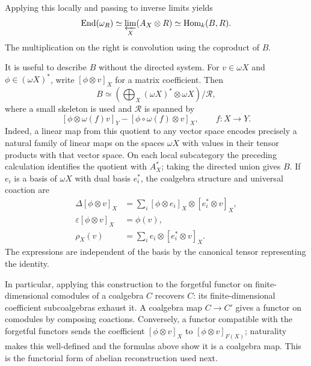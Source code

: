 Applying this locally and passing to inverse limits yields
\[
 \operatorname{End}(\omega_R)
 \simeq\varprojlim_X(A_X\otimes R)
 \simeq\operatorname{Hom}_k(B,R).
\]
The multiplication on the right is convolution using the coproduct of $B$.

It is useful to describe $B$ without the directed system. For $v\in\omega X$ and $\phi\in(\omega X)^*$, write $[\phi\otimes v]_X$ for a matrix coefficient. Then
\[
 B\simeq
 \left(\bigoplus_{X}(\omega X)^*\otimes\omega X\right)\big/\mathcal R,
\]
where a small skeleton is used and $\mathcal R$ is spanned by
\[
 [\phi\otimes\omega(f)v]_Y-[\phi\circ\omega(f)\otimes v]_X,
 \qquad f:X\to Y.
\]
Indeed, a linear map from this quotient to any vector space encodes precisely a natural family of linear maps on the spaces $\omega X$ with values in their tensor products with that vector space. On each local subcategory the preceding calculation identifies the quotient with $A_X^*$; taking the directed union gives $B$. If $e_i$ is a basis of $\omega X$ with dual basis $e_i^*$, the coalgebra structure and universal coaction are
\[
\begin{split}
 \Delta[\phi\otimes v]_X
 &=\sum_i[\phi\otimes e_i]_X\otimes[e_i^*\otimes v]_X,\\
 \varepsilon[\phi\otimes v]_X&=\phi(v),\\
 \rho_X(v)&=\sum_i e_i\otimes[e_i^*\otimes v]_X.
\end{split}
\]
The expressions are independent of the basis by the canonical tensor representing the identity.

In particular, applying this construction to the forgetful functor on finite-dimensional comodules of a coalgebra $C$ recovers $C$: its finite-dimensional coefficient subcoalgebras exhaust it. A coalgebra map $C\to C'$ gives a functor on comodules by composing coactions. Conversely, a functor compatible with the forgetful functors sends the coefficient $[\phi\otimes v]_X$ to $[\phi\otimes v]_{F(X)}$; naturality makes this well-defined and the formulas above show it is a coalgebra map. This is the functorial form of abelian reconstruction used next.
